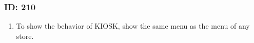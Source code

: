 \documentclass[conference,compsoc]{IEEEtran}
\begin{document}
\subsubsection{ID: 210}
\begin{enumerate}
  \item To show the behavior of KIOSK, show the same menu as the menu of any store.
\end{enumerate}

%
%



%
%
\end{document}
